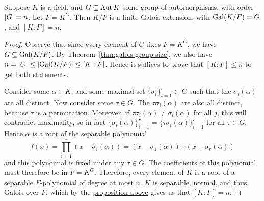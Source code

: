 \begin{theorem}\label{thm:artin-galois}
    Suppose \(K\) is a field, and \(G \subseteq \operatorname{Aut} K\) some group of automorphisms,
    with order \(\abs{G} = n\).
    Let \(F = K^G\).
    Then \(K/F\) is a finite Galois extension, with \(\operatorname{Gal}(K/F) = G\),
    and \([K:F] = n\).
\end{theorem}
\begin{proof}
    Observe that since every element of \(G\) fixes \(F = K^G\), we have \(G \subseteq \operatorname{Gal}(K/F)\).
    By Theorem~\ref{thm:galois-group-size}, we also have \(n = \abs{G} \leq \abs{\operatorname{Gal}(K/F)} \leq [K:F]\).
    Hence it suffices to prove that \([K:F] \leq n\) to get both statements.

    Consider some \(\alpha \in K\), and some maximal set \({\{\sigma_i\}}_{i=1}^r \subset G\)
    such that the \(\sigma_i(\alpha)\) are all distinct.
    Now consider some \(\tau \in G\).
    The \(\tau\sigma_i(\alpha)\) are also all distinct, because \(\tau\) is a permutation.
    Moreover, if \(\tau\sigma_i(\alpha) \neq \sigma_i(\alpha)\) for all \(j\),
    this will contradict maximality, so in fact
    \({\{\sigma_i(\alpha)\}}_{i=1}^r = {\{\tau\sigma_i(\alpha)\}}_{i=1}^r\) for all \(\tau \in G\).
    Hence \(\alpha\) is a root of the separable polynomial
    \begin{equation*}
        f(x) = \prod_{i=1}^r (x-\sigma_i(\alpha)) = (x-\sigma_1(\alpha)) \cdots (x-\sigma_r(\alpha))
    \end{equation*}
    and this polynomial is fixed under any \(\tau \in G\).
    The coefficients of this polynomial must therefore be in \(F = K^G\).
    Therefore, every element of \(K\) is a root of a separable \(F\)-polynomial of degree at most \(n\).
    \(K\) is separable, normal, and thus Galois over \(F\),
    which by the \hyperref[prop:galois-group-separable]{proposition above} gives us that \([K:F] = n\).
\end{proof}

